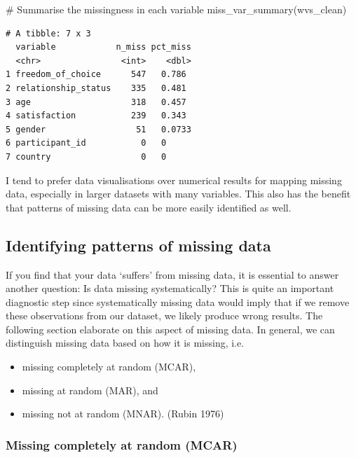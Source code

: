 \documentclass[
  letterpaper,
]{krantz}
\makeatletter
\newenvironment{Shaded}{\begin{snugshade}}{\end{snugshade}}
\newcommand{\CommentTok}[1]{\textcolor[rgb]{0.37,0.37,0.37}{#1}}
\newcommand{\FunctionTok}[1]{\textcolor[rgb]{0.28,0.35,0.67}{#1}}
\newcommand{\NormalTok}[1]{\textcolor[rgb]{0.00,0.23,0.31}{#1}}
\newenvironment{kframe}{%
\medskip{}
\setlength{\fboxsep}{.8em}
 \def\at@end@of@kframe{}%
 \ifinner\ifhmode%
  \def\at@end@of@kframe{\end{minipage}}%
  \begin{minipage}{\columnwidth}%
 \fi\fi%
 \def\FrameCommand##1{\hskip\@totalleftmargin \hskip-\fboxsep
 \colorbox{shadecolor}{##1}\hskip-\fboxsep
     \hskip-\linewidth \hskip-\@totalleftmargin \hskip\columnwidth}%
 \MakeFramed {\advance\hsize-\width
   \@totalleftmargin\z@ \linewidth\hsize
   \@setminipage}}%
 {\par\unskip\endMakeFramed%
 \at@end@of@kframe}
\renewenvironment{Shaded}{\begin{kframe}}{\end{kframe}}
\makeatother
\begin{document}
\begin{Shaded}
\begin{Highlighting}[]
\CommentTok{\# Summarise the missingness in each variable}
\FunctionTok{miss\_var\_summary}\NormalTok{(wvs\_clean)}
\end{Highlighting}
\end{Shaded}

\begin{verbatim}
# A tibble: 7 x 3
  variable            n_miss pct_miss
  <chr>                <int>    <dbl>
1 freedom_of_choice      547   0.786 
2 relationship_status    335   0.481 
3 age                    318   0.457 
4 satisfaction           239   0.343 
5 gender                  51   0.0733
6 participant_id           0   0     
7 country                  0   0     
\end{verbatim}

I tend to prefer data visualisations over numerical results for mapping
missing data, especially in larger datasets with many variables. This
also has the benefit that patterns of missing data can be more easily
identified as well.

\subsection{Identifying patterns of missing
data}\label{patterns-of-missing-data}

If you find that your data `suffers' from missing data, it is essential
to answer another question: Is data missing systematically? This is
quite an important diagnostic step since systematically missing data
would imply that if we remove these observations from our dataset, we
likely produce wrong results. The following section elaborate on this
aspect of missing data. In general, we can distinguish missing data
based on how it is missing, i.e.

\begin{itemize}
\item
  missing completely at random (MCAR),
\item
  missing at random (MAR), and
\item
  missing not at random (MNAR). (Rubin 1976)
\end{itemize}

\subsubsection{Missing completely at random
(MCAR)}\label{missing-completetly-at-random-mcar}
\end{document}

